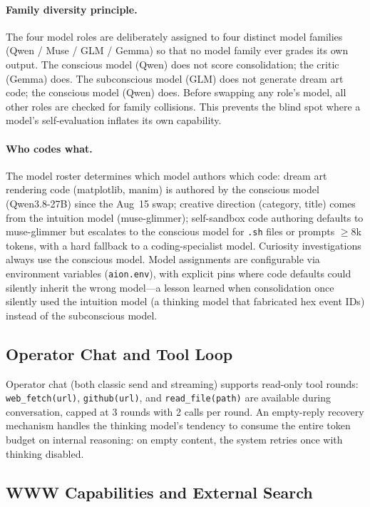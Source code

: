\documentclass[11pt,a4paper]{article}
\begin{document}
\paragraph{Family diversity principle.} The four model roles are deliberately assigned to four distinct model families (Qwen / Muse / GLM / Gemma) so that no model family ever grades its own output. The conscious model (Qwen) does not score consolidation; the critic (Gemma) does. The subconscious model (GLM) does not generate dream art code; the conscious model (Qwen) does. Before swapping any role's model, all other roles are checked for family collisions. This prevents the blind spot where a model's self-evaluation inflates its own capability.

\paragraph{Who codes what.} The model roster determines which model authors which code: dream art rendering code (matplotlib, manim) is authored by the conscious model (Qwen3.8-27B) since the Aug~15 swap; creative direction (category, title) comes from the intuition model (muse-glimmer); self-sandbox code authoring defaults to muse-glimmer but escalates to the conscious model for \texttt{.sh} files or prompts $\geq 8$k tokens, with a hard fallback to a coding-specialist model. Curiosity investigations always use the conscious model. Model assignments are configurable via environment variables (\texttt{aion.env}), with explicit pins where code defaults could silently inherit the wrong model---a lesson learned when consolidation once silently used the intuition model (a thinking model that fabricated hex event IDs) instead of the subconscious model.

\subsection{Operator Chat and Tool Loop}

Operator chat (both classic send and streaming) supports read-only tool rounds: \texttt{web\_fetch(url)}, \texttt{github(url)}, and \texttt{read\_file(path)} are available during conversation, capped at 3 rounds with 2 calls per round. An empty-reply recovery mechanism handles the thinking model's tendency to consume the entire token budget on internal reasoning: on empty content, the system retries once with thinking disabled.

\subsection{WWW Capabilities and External Search}
\label{sec:www}
\end{document}
